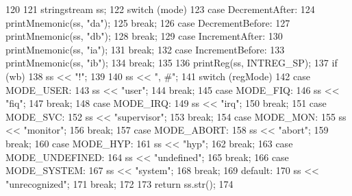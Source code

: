 \begin{DoxyCode}
120 {
121     stringstream ss;
122     switch (mode) {
123       case DecrementAfter:
124         printMnemonic(ss, "da");
125         break;
126       case DecrementBefore:
127         printMnemonic(ss, "db");
128         break;
129       case IncrementAfter:
130         printMnemonic(ss, "ia");
131         break;
132       case IncrementBefore:
133         printMnemonic(ss, "ib");
134         break;
135     }
136     printReg(ss, INTREG_SP);
137     if (wb) {
138         ss << "!";
139     }
140     ss << ", #";
141     switch (regMode) {
142       case MODE_USER:
143         ss << "user";
144         break;
145       case MODE_FIQ:
146         ss << "fiq";
147         break;
148       case MODE_IRQ:
149         ss << "irq";
150         break;
151       case MODE_SVC:
152         ss << "supervisor";
153         break;
154       case MODE_MON:
155         ss << "monitor";
156         break;
157       case MODE_ABORT:
158         ss << "abort";
159         break;
160       case MODE_HYP:
161         ss << "hyp";
162         break;
163       case MODE_UNDEFINED:
164         ss << "undefined";
165         break;
166       case MODE_SYSTEM:
167         ss << "system";
168         break;
169       default:
170         ss << "unrecognized";
171         break;
172     }
173     return ss.str();
174 }
\end{DoxyCode}


